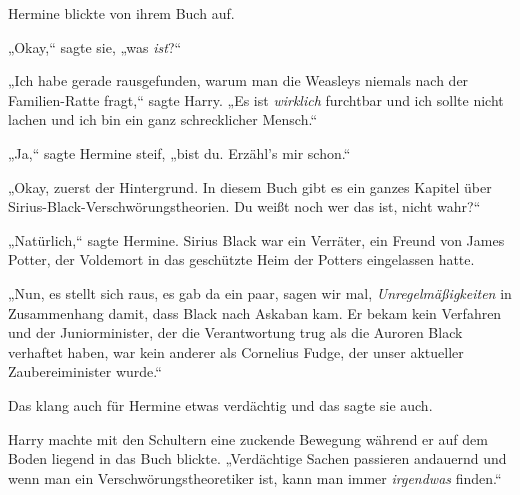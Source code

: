 Hermine blickte von ihrem Buch auf.

„Okay,“ sagte sie, „was \emph{ist}?“

„Ich habe gerade rausgefunden, warum man die Weasleys niemals nach der Familien-Ratte fragt,“ sagte Harry. „Es ist \emph{wirklich} furchtbar und ich sollte nicht lachen und ich bin ein ganz schrecklicher Mensch.“

„Ja,“ sagte Hermine steif, „bist du. Erzähl's mir schon.“

„Okay, zuerst der Hintergrund. In diesem Buch gibt es ein ganzes Kapitel über Sirius-Black-Verschwörungstheorien. Du weißt noch wer das ist, nicht wahr?“

„Natürlich,“ sagte Hermine. Sirius Black war ein Verräter, ein Freund von James Potter, der Voldemort in das geschützte Heim der Potters eingelassen hatte.

„Nun, es stellt sich raus, es gab da ein paar, sagen wir mal, \emph{Unregelmäßigkeiten} in Zusammenhang damit, dass Black nach Askaban kam. Er bekam kein Verfahren und der Juniorminister, der die Verantwortung trug als die Auroren Black verhaftet haben, war kein anderer als Cornelius Fudge, der unser aktueller Zaubereiminister wurde.“

Das klang auch für Hermine etwas verdächtig und das sagte sie auch.

Harry machte mit den Schultern eine zuckende Bewegung während er auf dem Boden liegend in das Buch blickte. „Verdächtige Sachen passieren andauernd und wenn man ein Verschwörungstheoretiker ist, kann man immer \emph{irgendwas} finden.“

